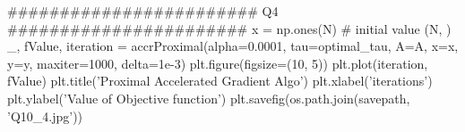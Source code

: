 \documentclass[12pt, a4 paper]{article}
\begin{document}
\begin{framed}
\begin{python}
    ######################## Q4 #######################
    x = np.ones(N) # initial value (N, )
    _, fValue, iteration = accrProximal(alpha=0.0001, tau=optimal_tau, A=A, x=x, y=y, maxiter=1000, delta=1e-3)
    plt.figure(figsize=(10, 5))
    plt.plot(iteration, fValue)
    plt.title('Proximal Accelerated Gradient Algo')
    plt.xlabel('iterations')
    plt.ylabel('Value of Objective function')
    plt.savefig(os.path.join(savepath, 'Q10_4.jpg'))
        \end{python}
    \end{framed}
\end{document}
